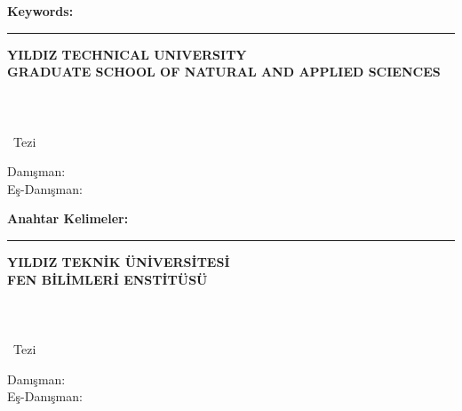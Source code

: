 \abstractTextEnglish

{\bfseries Keywords:} \abstractKeywordsEnglish

\vfill


\begin{center}
\rule{0.8\textwidth}{.1pt}

\bfseries \small
 YILDIZ TECHNICAL UNIVERSITY\\
 GRADUATE SCHOOL OF NATURAL AND APPLIED SCIENCES
\end{center}

\newpage
\chapter*{\tabstract}

\begin{center}
{\bfseries \Large\titleTR}

\student

\departmentTR \\ {\tdegree~Tezi}

Danışman: \advisorTR \\
\ifnum{}
Eş-Danışman: \coadvisorTR
\fi  


\end{center}

\abstractTextTurkish

{\bfseries Anahtar Kelimeler:} \abstractKeywordsTurkish

\vfill


\begin{center}
\rule{0.8\textwidth}{.1pt}

\bfseries \small
 YILDIZ TEKNİK ÜNİVERSİTESİ\\
 FEN BİLİMLERİ ENSTİTÜSÜ
\end{center}

\else
\newpage
\chapter*{\tabstract}

\begin{center}
{\bfseries \Large\titleTR}

\student

\departmentTR \\ {\tdegree~Tezi}

Danışman: \advisorTR \\
Eş-Danışman: \coadvisorTR

\end{center}

